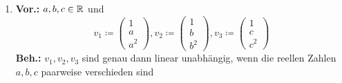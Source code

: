 \documentclass{gadsescript}
\begin{document}
\begin{enumerate}[label=(\roman*)]
\begin{proof*}
		\end{proof*}
	\item \textbf{Vor.:} $ a,b,c \in \mathbb{R}  $ und 
		\[
			v_1 \coloneqq \begin{pmatrix} 1 \\ a \\ a^2 \end{pmatrix} , v_2 \coloneqq \begin{pmatrix} 1 \\ b \\ b^2 \end{pmatrix} , v_3 \coloneqq \begin{pmatrix} 1 \\ c \\ c^2 \end{pmatrix} 
		\]
		\textbf{Beh.:} $ v_1, v_2, v_3 $ sind genau dann linear unabhängig, wenn die reellen Zahlen $ a, b, c $ paarweise verschieden sind
		\begin{proof*}
			

\end{proof*}
\end{enumerate}
\end{document}
